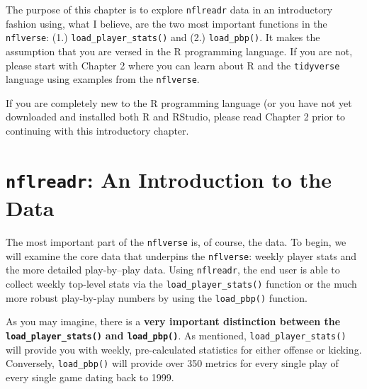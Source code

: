 \documentclass[
  letterpaper,
]{krantz}
\begin{document}
The purpose of this chapter is to explore \texttt{nflreadr} data in an
introductory fashion using, what I believe, are the two most important
functions in the \texttt{nflverse}: (1.) \texttt{load\_player\_stats()}
and (2.) \texttt{load\_pbp()}. It makes the assumption that you are
versed in the R programming language. If you are not, please start with
Chapter 2 where you can learn about R and the \texttt{tidyverse}
language using examples from the \texttt{nflverse}.

\begin{tcolorbox}[enhanced jigsaw, breakable, leftrule=.75mm, colframe=quarto-callout-important-color-frame, toptitle=1mm, rightrule=.15mm, colbacktitle=quarto-callout-important-color!10!white, colback=white, bottomrule=.15mm, bottomtitle=1mm, titlerule=0mm, coltitle=black, opacitybacktitle=0.6, title=\textcolor{quarto-callout-important-color}{\faExclamation}\hspace{0.5em}{Important}, arc=.35mm, toprule=.15mm, left=2mm, opacityback=0]
If you are completely new to the R programming language (or you have not
yet downloaded and installed both R and RStudio, please read Chapter 2
prior to continuing with this introductory chapter.
\end{tcolorbox}

\hypertarget{nflreadr-an-introduction-to-the-data}{%
\section{\texorpdfstring{\texttt{nflreadr}: An Introduction to the
Data}{nflreadr: An Introduction to the Data}}\label{nflreadr-an-introduction-to-the-data}}

The most important part of the \texttt{nflverse} is, of course, the
data. To begin, we will examine the core data that underpins the
\texttt{nflverse}: weekly player stats and the more detailed
play-by--play data. Using \texttt{nflreadr}, the end user is able to
collect weekly top-level stats via the \texttt{load\_player\_stats()}
function or the much more robust play-by-play numbers by using the
\texttt{load\_pbp()} function.

As you may imagine, there is a \textbf{very important distinction
between the \texttt{load\_player\_stats()}} \textbf{and
\texttt{load\_pbp()}}. As mentioned, \texttt{load\_player\_stats()} will
provide you with weekly, pre-calculated statistics for either offense or
kicking. Conversely, \texttt{load\_pbp()} will provide over 350 metrics
for every single play of every single game dating back to 1999.
\end{document}
